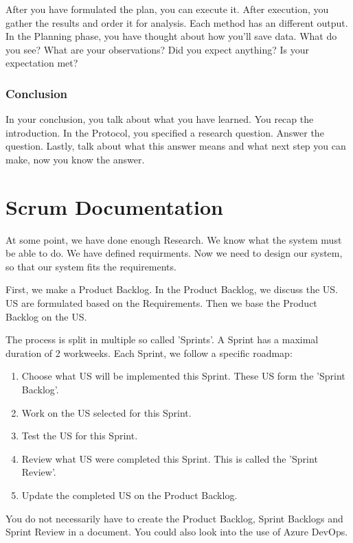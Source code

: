 \documentclass[10pt]{report}
\begin{document}
After you have formulated the plan, you can execute it. After execution, you gather the results and order it for analysis. Each method has an different output. In the Planning phase, you have thought about how you'll save data. What do you see? What are your observations? Did you expect anything? Is your expectation met?

\subsection{Conclusion}

In your conclusion, you talk about what you have learned. You recap the introduction. In the Protocol, you specified a research question. Answer the question. Lastly, talk about what this answer means and what next step you can make, now you know the answer.

\newpage

\chapter{Scrum Documentation}

At some point, we have done enough Research. We know what the system must be able to do. We have defined requirments. Now we need to design our system, so that our system fits the requirements.

\medskip
\minitoc
\medskip

\noindent First, we make a Product Backlog. In the Product Backlog, we discuss the US. US are formulated based on the Requirements. Then we base the Product Backlog on the US. 

\noindent The process is split in multiple so called 'Sprints'. A Sprint has a maximal duration of 2 workweeks. Each Sprint, we follow a specific roadmap:

\begin{enumerate}
	\item Choose what US will be implemented this Sprint. These US form the 'Sprint Backlog'.
	\item Work on the US selected for this Sprint.
	\item Test the US for this Sprint.
	\item Review what US were completed this Sprint. This is called the 'Sprint Review'.
	\item Update the completed US on the Product Backlog.
\end{enumerate}

\noindent You do not necessarily have to create the Product Backlog, Sprint Backlogs and Sprint Review in a document. You could also look into the use of Azure DevOps.
\end{document}
